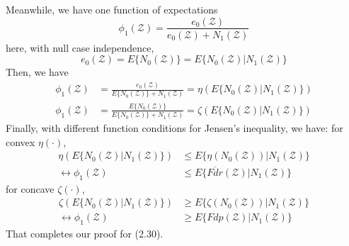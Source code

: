 \documentclass{article}
\begin{document}
\subsubsection*{}
Meanwhile, we have one function of expectations
\begin{displaymath}
\phi_1(\mathcal{Z}) = \frac{e_0(\mathcal{Z})}{e_0(\mathcal{Z}) + N_1(\mathcal{Z})}
\end{displaymath}
here, with null case independence,
\begin{displaymath}
e_0(\mathcal{Z}) = E\{ N_0(\mathcal{Z}) \} = E\{ N_0(\mathcal{Z}) | N_1(\mathcal{Z})\}
\end{displaymath}
Then, we have
\begin{displaymath}
\begin{split}
\phi_1(\mathcal{Z}) &= \frac{e_0(\mathcal{Z})}{E\{N_0(\mathcal{Z})\} +  N_1(\mathcal{Z})} 
= \eta(E\{N_0(\mathcal{Z}) | N_1(\mathcal{Z})\}) \\
\phi_1(\mathcal{Z}) &= \frac{E\{N_0(\mathcal{Z})\}}{E\{N_0(\mathcal{Z})\} +  N_1(\mathcal{Z})} 
= \zeta(E\{N_0(\mathcal{Z}) | N_1(\mathcal{Z})\})
\end{split}
\end{displaymath}
Finally, with different function conditions for Jensen's inequality,
we have:\newline
for convex $\eta(\cdot)$,
\begin{displaymath}
\begin{split}
\eta(E\{N_0(\mathcal{Z}) | N_1(\mathcal{Z})\}) &\leq E\{\eta(N_0(\mathcal{Z})) | N_1(\mathcal{Z}) \} \\
\leftrightarrow
\phi_1(\mathcal{Z}) &\leq E\{\overline{Fdr}(\mathcal{Z}) | N_1(\mathcal{Z})\} 
\end{split}
\end{displaymath}
for concave $\zeta(\cdot)$,
\begin{displaymath}
\begin{split}
\zeta(E\{N_0(\mathcal{Z}) | N_1(\mathcal{Z})\}) &\geq E\{\zeta(N_0(\mathcal{Z})) | N_1(\mathcal{Z}) \} \\
\leftrightarrow
\phi_1(\mathcal{Z}) &\geq E\{Fdp(\mathcal{Z}) | N_1(\mathcal{Z})\} 
\end{split}
\end{displaymath}
That completes our proof for (2.30).
\end{document}
